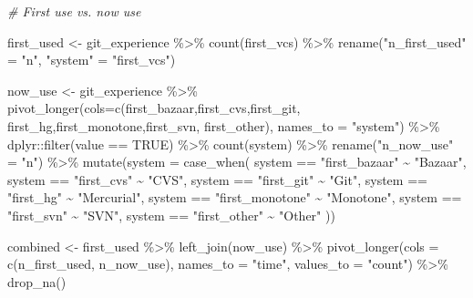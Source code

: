 \documentclass[
]{krantz}
\makeatletter
\newenvironment{Shaded}{\begin{snugshade}}{\end{snugshade}}
\newcommand{\AttributeTok}[1]{\textcolor[rgb]{0.61,0.61,0.61}{#1}}
\newcommand{\CommentTok}[1]{\textcolor[rgb]{0.37,0.37,0.37}{\textit{#1}}}
\newcommand{\ConstantTok}[1]{\textcolor[rgb]{0,0,0}{#1}}
\newcommand{\FunctionTok}[1]{\textcolor[rgb]{0,0,0}{#1}}
\newcommand{\NormalTok}[1]{#1}
\newcommand{\OtherTok}[1]{\textcolor[rgb]{0.37,0.37,0.37}{#1}}
\newcommand{\SpecialCharTok}[1]{\textcolor[rgb]{0,0,0}{#1}}
\newcommand{\StringTok}[1]{\textcolor[rgb]{0.5,0.5,0.5}{#1}}
\newenvironment{kframe}{%
\medskip{}
\setlength{\fboxsep}{.8em}
 \def\at@end@of@kframe{}%
 \ifinner\ifhmode%
  \def\at@end@of@kframe{\end{minipage}}%
  \begin{minipage}{\columnwidth}%
 \fi\fi%
 \def\FrameCommand##1{\hskip\@totalleftmargin \hskip-\fboxsep
 \colorbox{shadecolor}{##1}\hskip-\fboxsep
     \hskip-\linewidth \hskip-\@totalleftmargin \hskip\columnwidth}%
 \MakeFramed {\advance\hsize-\width
   \@totalleftmargin\z@ \linewidth\hsize
   \@setminipage}}%
 {\par\unskip\endMakeFramed%
 \at@end@of@kframe}
\renewenvironment{Shaded}{\begin{kframe}}{\end{kframe}}
\makeatother
\begin{document}
\begin{Shaded}
\begin{Highlighting}[]
\CommentTok{\# First use vs. now use}

\NormalTok{first\_used }\OtherTok{\textless{}{-}}\NormalTok{ git\_experience }\SpecialCharTok{\%\textgreater{}\%} 
  \FunctionTok{count}\NormalTok{(first\_vcs) }\SpecialCharTok{\%\textgreater{}\%}
  \FunctionTok{rename}\NormalTok{(}\StringTok{"n\_first\_used"} \OtherTok{=} \StringTok{"n"}\NormalTok{, }\StringTok{"system"} \OtherTok{=} \StringTok{"first\_vcs"}\NormalTok{)}

\NormalTok{now\_use }\OtherTok{\textless{}{-}}\NormalTok{ git\_experience }\SpecialCharTok{\%\textgreater{}\%}
  \FunctionTok{pivot\_longer}\NormalTok{(}\AttributeTok{cols=}\FunctionTok{c}\NormalTok{(first\_bazaar,first\_cvs,first\_git,}
\NormalTok{                      first\_hg,first\_monotone,first\_svn, first\_other),}
               \AttributeTok{names\_to =} \StringTok{"system"}\NormalTok{) }\SpecialCharTok{\%\textgreater{}\%}
\NormalTok{  dplyr}\SpecialCharTok{::}\FunctionTok{filter}\NormalTok{(value }\SpecialCharTok{==} \ConstantTok{TRUE}\NormalTok{) }\SpecialCharTok{\%\textgreater{}\%}
  \FunctionTok{count}\NormalTok{(system) }\SpecialCharTok{\%\textgreater{}\%}
  \FunctionTok{rename}\NormalTok{(}\StringTok{"n\_now\_use"} \OtherTok{=} \StringTok{"n"}\NormalTok{) }\SpecialCharTok{\%\textgreater{}\%}
  \FunctionTok{mutate}\NormalTok{(}\AttributeTok{system =} \FunctionTok{case\_when}\NormalTok{(}
\NormalTok{    system }\SpecialCharTok{==} \StringTok{"first\_bazaar"} \SpecialCharTok{\textasciitilde{}} \StringTok{"Bazaar"}\NormalTok{,}
\NormalTok{    system }\SpecialCharTok{==} \StringTok{"first\_cvs"} \SpecialCharTok{\textasciitilde{}} \StringTok{"CVS"}\NormalTok{,}
\NormalTok{    system }\SpecialCharTok{==}  \StringTok{"first\_git"} \SpecialCharTok{\textasciitilde{}} \StringTok{"Git"}\NormalTok{,}
\NormalTok{    system }\SpecialCharTok{==}  \StringTok{"first\_hg"} \SpecialCharTok{\textasciitilde{}} \StringTok{"Mercurial"}\NormalTok{,}
\NormalTok{    system }\SpecialCharTok{==}  \StringTok{"first\_monotone"} \SpecialCharTok{\textasciitilde{}} \StringTok{"Monotone"}\NormalTok{,}
\NormalTok{    system }\SpecialCharTok{==}  \StringTok{"first\_svn"} \SpecialCharTok{\textasciitilde{}} \StringTok{"SVN"}\NormalTok{, }
\NormalTok{    system }\SpecialCharTok{==}  \StringTok{"first\_other"} \SpecialCharTok{\textasciitilde{}} \StringTok{"Other"}
\NormalTok{  ))}

\NormalTok{combined }\OtherTok{\textless{}{-}}\NormalTok{ first\_used }\SpecialCharTok{\%\textgreater{}\%} \FunctionTok{left\_join}\NormalTok{(now\_use) }\SpecialCharTok{\%\textgreater{}\%}
  \FunctionTok{pivot\_longer}\NormalTok{(}\AttributeTok{cols =} \FunctionTok{c}\NormalTok{(n\_first\_used, n\_now\_use), }
               \AttributeTok{names\_to =} \StringTok{"time"}\NormalTok{,}
               \AttributeTok{values\_to =} \StringTok{"count"}\NormalTok{) }\SpecialCharTok{\%\textgreater{}\%}
  \FunctionTok{drop\_na}\NormalTok{()}
\end{Highlighting}
\end{Shaded}
\end{document}
